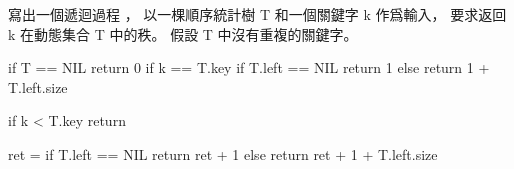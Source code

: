 \startEXERCISE
寫出一個遞迴過程 ，
以一棵順序統計樹 T 和一個關鍵字 k 作爲輸入，
要求返回 k 在動態集合 T 中的秩。
假設 T 中沒有重複的關鍵字。
\stopEXERCISE

\startANSWER
{}
\startCLRSCODE
if T == NIL
	return 0
if k == T.key
	if T.left == NIL
		return 1
	else
		return 1 + T.left.size

if k < T.key
	return 

ret = 
if T.left == NIL
	return ret + 1
else
	return ret + 1 + T.left.size
\stopCLRSCODE
\stopANSWER

